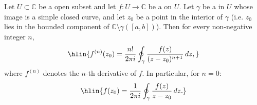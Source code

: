 \begin{theorem} \label{theorem:cauchy_integral_formula_for_holomorphic_functions_expressing_values_of_derivatives_of_holomorphic_functions_on_simply_connected_open_subsets_of_the_complex_planevia_contour_integrals}
    Let $U \subset \mathbb{C}$ be a  open subset and let $f : U \to \mathbb{C}$ be a  on $U$. Let $\gamma$ be a   in $U$ whose image is a simple closed curve, and let $z_0$ be a point in the interior of $\gamma$ (i.e. $z_0$ lies in the bounded component of $\mathbb{C} \setminus \gamma([a,b])$). Then for every non-negative integer $n$,
    $$\hlin{f^{(n)}(z_0) = \frac{n!}{2\pi i} \oint_{\gamma} \frac{f(z)}{(z - z_0)^{n+1}}\,dz,}$$
    where $f^{(n)}$ denotes the $n$-th derivative of $f$. In particular, for $n = 0$:
    $$\hlin{f(z_0) = \frac{1}{2\pi i} \oint_{\gamma} \frac{f(z)}{z - z_0}\,dz.}$$
\end{theorem}

